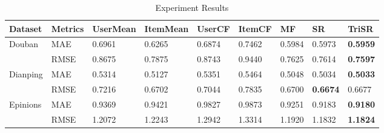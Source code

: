 \documentclass{article}
\begin{document}
\begin{table}[h]
  \caption{Experiment Results}
  \centering
  \begin{tabular}{lllllllll}
    \toprule
    Dataset  & Metrics  & UserMean & ItemMean & UserCF & ItemCF & MF & SR & TriSR \\
    \midrule
    \midrule
    Douban   & MAE      &  0.6961  & 0.6265   & 0.6874 & 0.7462 & 0.5984  & 0.5973 & \textbf{0.5959} \\
             & RMSE     &  0.8675  & 0.7875   & 0.8743 & 0.9440 & 0.7625  & 0.7614 & \textbf{0.7597} \\
    \midrule
    Dianping & MAE      & 0.5314   & 0.5127   & 0.5351 & 0.5464 & 0.5048 & 0.5034 & \textbf{0.5033} \\
             & RMSE     & 0.7216   & 0.6702   & 0.7044 & 0.7835 & 0.6700 & \textbf{0.6674} & 0.6677 \\
    \midrule
    Epinions & MAE      & 0.9369   & 0.9421   & 0.9827 & 0.9873 & 0.9251 & 0.9183   & \textbf{0.9180} \\
             & RMSE     & 1.2072   & 1.2243   & 1.2942 & 1.3314 & 1.1920 & 1.1832   & \textbf{1.1824} \\
    \bottomrule
  \end{tabular}
\end{table}
\end{document}

